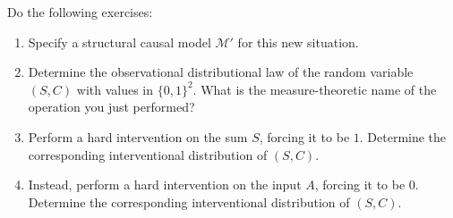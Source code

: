   Do the following exercises:
  \begin{enumerate}
    \item Specify a structural causal model $\mathcal{M}'$ for this new situation.
    \item Determine the observational distributional law of the random variable $(S, C)$ with values in $\{0, 1\}^2$. 
      What is the measure-theoretic name of the operation you just performed?
    \item Perform a hard intervention on the sum $S$, forcing it to be $1$.
      Determine the corresponding interventional distribution of $(S, C)$.
    \item Instead, perform a hard intervention on the input $A$, forcing it to be $0$.
      Determine the corresponding interventional distribution of $(S, C)$.
    \end{enumerate}
